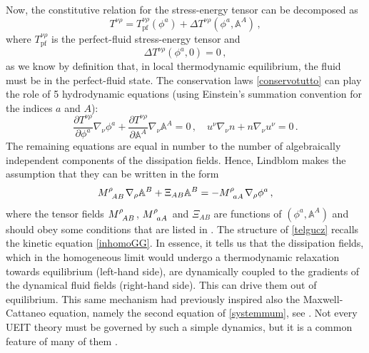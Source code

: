 \documentclass[a4paper, amsfonts, amssymb, amsmath, reprint, twocolumn, showkeys, nofootinbib]{revtex4-2}
\begin{document}
Now, the constitutive relation for the stress-energy tensor can  be decomposed as
\begin{equation}
T^{\nu \rho}= T^{\nu \rho}_{\text{pf}}(\phi^a) + \Delta T^{\nu \rho}(\phi^a,\mathbb{A}^A) \, ,
\end{equation}
where $T_{\text{pf}}^{\nu \rho}$ is the perfect-fluid stress-energy tensor and
\begin{equation}
\Delta T^{\nu \rho}(\phi^a,0)=0 \, ,
\end{equation}
as we know by definition that, in local thermodynamic equilibrium, the fluid must be in the perfect-fluid state.
The conservation laws \eqref{conservotutto} can play the role of 5 hydrodynamic equations (using Einstein's summation convention for the indices $a$ and $A$):
\begin{equation}
  \dfrac{\partial T^{\nu \rho}}{\partial \phi^a} \nabla_\nu \phi^a + \dfrac{\partial T^{\nu \rho}}{\partial \mathbb{A}^A} \nabla_\nu \mathbb{A}^A =0 \, ,
  \quad  
  u^\nu \nabla_\nu n+ n\nabla_\nu u^\nu  =0 \, .  
\end{equation}
The remaining equations are equal in number to the number of algebraically independent components of the dissipation fields. Hence, Lindblom makes the assumption that they can be written in the form
\begin{equation}\label{telgucz}
M\indices{^\rho _A _B} \nabla_\rho \mathbb{A}^B + \Xi_{AB} \mathbb{A}^B = - M\indices{^\rho _a _A} \nabla_\rho \phi^a \, ,
\end{equation}
where the tensor fields $M\indices{^\rho _A _B}$, $M\indices{^\rho _a _A}$ and $\Xi_{AB}$ are functions of $(\phi^a,\mathbb{A}^A)$ and should obey some conditions that are listed in \cite{LindblomRelaxation1996}. The structure of \eqref{telgucz} recalls the kinetic equation \eqref{inhomoGG}. In essence, it tells us that the dissipation fields, which in the homogeneous limit would undergo a thermodynamic relaxation towards equilibrium (left-hand side), are dynamically coupled to the gradients of the dynamical fluid fields (right-hand side). 
This can drive them out of equilibrium. This same mechanism had previously inspired also the Maxwell-Cattaneo equation, namely the second equation of \eqref{systemmum}, see \cite{cattaneo1958}. Not every UEIT theory must be governed by such a simple dynamics, but it is a common feature of many of them \citep{Geroch_Lindblom_1991_causal}.
\end{document}
